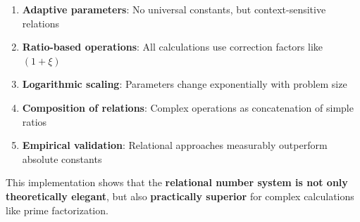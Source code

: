 	\begin{enumerate}
		\item \textbf{Adaptive parameters}: No universal constants, but context-sensitive relations
		\item \textbf{Ratio-based operations}: All calculations use correction factors like $(1 + \xi)$
		\item \textbf{Logarithmic scaling}: Parameters change exponentially with problem size
		\item \textbf{Composition of relations}: Complex operations as concatenation of simple ratios
		\item \textbf{Empirical validation}: Relational approaches measurably outperform absolute constants
	\end{enumerate}
	
	This implementation shows that the \textbf{relational number system is not only theoretically elegant}, but also \textbf{practically superior} for complex calculations like prime factorization.
